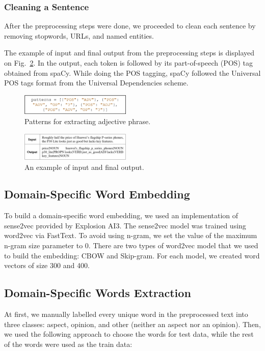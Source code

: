 \documentclass[a4paper,conference]{IEEEtran}
\begin{document}
\subsubsection{Cleaning a Sentence}
After the preprocessing steps were done, we proceeded to clean each sentence by removing stopwords, URLs, and named entities.

The example of input and final output from the preprocessing steps is displayed on Fig.~\ref{fig5}. In the output, each token is followed by its part-of-speech (POS) tag obtained from spaCy. While doing the POS tagging, spaCy followed the Universal POS tags format from the Universal Dependencies scheme.

\begin{figure}[htbp]
\centerline{\includegraphics[width=0.47\textwidth]{fig4.jpg}}
\caption{Patterns for extracting adjective phrase.}
\label{fig4}
\end{figure}

\begin{figure}[htbp]
\centerline{\includegraphics[width=0.47\textwidth]{fig5.jpg}}
\caption{An example of input and final output.}
\label{fig5}
\end{figure}

\subsection{Domain-Specific Word Embedding}
To build a domain-specific word embedding, we used an implementation of sense2vec provided by Explosion AI3. The sense2vec model was trained using word2vec via FastText. To avoid using n-gram, we set the value of the maximum n-gram size parameter to 0. There are two types of word2vec model that we used to build the embedding: CBOW and Skip-gram. For each model, we created word vectors of size 300 and 400.

\subsection{Domain-Specific Words Extraction}
At first, we manually labelled every unique word in the preprocessed text into three classes: aspect, opinion, and other (neither an aspect nor an opinion). Then, we used the following approach to choose the words for test data, while the rest of the words were used as the train data:
\end{document}
